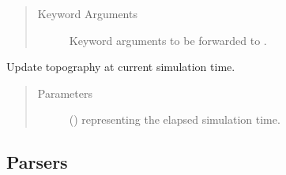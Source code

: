 \documentclass[letterpaper,10pt,english]{sphinxmanual}
\begin{document}
\begin{fulllineitems}
\begin{fulllineitems}
\begin{quote}
\begin{description}
\item[{Keyword Arguments}] \leavevmode
{} \textendash{} Keyword arguments to be forwarded to .

\end{description}\end{quote}

\end{fulllineitems}


\begin{fulllineitems}
\label{\detokenize{api:tasmania.grids.topography.Topography2d.update}}
Update topography at current simulation time.
\begin{quote}\begin{description}
\item[{Parameters}] \leavevmode
{} () \textendash{}  representing the elapsed simulation time.

\end{description}\end{quote}

\end{fulllineitems}


\end{fulllineitems}



\subsection{Parsers}
\label{\detokenize{api:parsers}}
\end{document}
